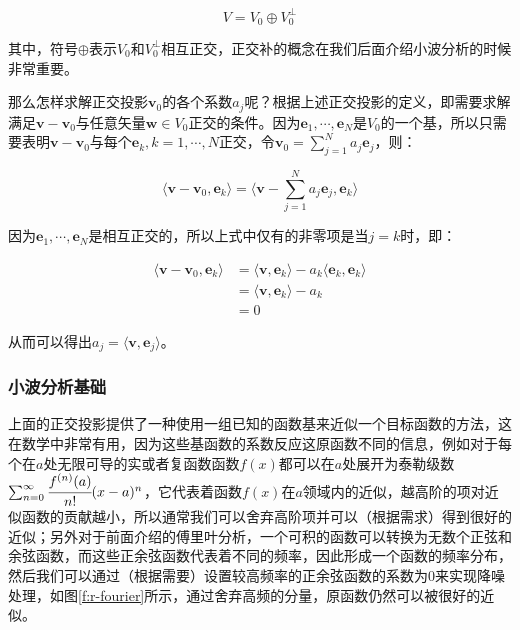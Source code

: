 \begin{equation}\label{e:r-orthogonal-complement-2}
	V=V_0\oplus V^{\perp}_0
\end{equation}

\noindent 其中，符号$\oplus$表示$V_0$和$V^{\perp}_0$相互正交，正交补的概念在我们后面介绍小波分析的时候非常重要。

那么怎样求解正交投影$\mathbf{v}_0$的各个系数$a_j$呢？根据上述正交投影的定义，即需要求解满足$\mathbf{v}-\mathbf{v}_0$与任意矢量$\mathbf{w}\in V_0$正交的条件。因为$\mathbf{e}_1,\cdots,\mathbf{e}_N$是$V_0$的一个基，所以只需要表明$\mathbf{v}-\mathbf{v}_0$与每个$\mathbf{e}_k,k=1,\cdots,N$正交，令$\mathbf{v}_0=\sum^{N}_{j=1}a_j\mathbf{e}_j$，则：

\begin{equation}
	\langle\mathbf{v}-\mathbf{v}_0,\mathbf{e}_k\rangle=\langle\mathbf{v}-\sum^{N}_{j=1}a_j\mathbf{e}_j,\mathbf{e}_k\rangle
\end{equation}

\noindent 因为$\mathbf{e}_1,\cdots,\mathbf{e}_N$是相互正交的，所以上式中仅有的非零项是当$j=k$时，即：

\begin{equation}
\begin{aligned}
	\langle\mathbf{v}-\mathbf{v}_0,\mathbf{e}_k\rangle&=\langle\mathbf{v},\mathbf{e}_k\rangle-a_k\langle\mathbf{e}_k,\mathbf{e}_k\rangle\\
	&=\langle\mathbf{v},\mathbf{e}_k\rangle-a_k\\
	&=0
\end{aligned}
\end{equation}

\noindent 从而可以得出$a_j=\langle\mathbf{v},\mathbf{e}_j\rangle$。




\subsubsection{小波分析基础}\label{sec:r-wavelets}
上面的正交投影提供了一种使用一组已知的函数基来近似一个目标函数的方法，这在数学中非常有用，因为这些基函数的系数反应这原函数不同的信息，例如对于每个在$a$处无限可导的实或者复函数函数$f(x)$都可以在$a$处展开为泰勒级数$\sum^{\infty}_{n=0} \cfrac{f^{(n)}(a)}{n!}(x-a)^{n}$，它代表着函数$f(x)$在$a$领域内的近似，越高阶的项对近似函数的贡献越小，所以通常我们可以舍弃高阶项并可以（根据需求）得到很好的近似；另外对于前面介绍的傅里叶分析，一个可积的函数可以转换为无数个正弦和余弦函数，而这些正余弦函数代表着不同的频率，因此形成一个函数的频率分布，然后我们可以通过（根据需要）设置较高频率的正余弦函数的系数为0来实现降噪处理，如图\ref{f:r-fourier}所示，通过舍弃高频的分量，原函数仍然可以被很好的近似。

